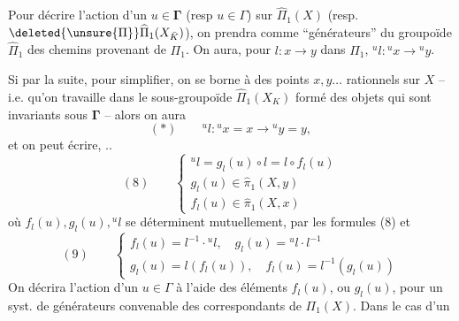 Pour décrire l'action d'un $u\in\mathbf{\Gamma}$ (resp $u\in\Gamma$) sur $\widehat\Pi_1(X)$ (resp. $\deleted{\unsure{\Pi}}\widehat\Pi_1(X_{\bar K})$), on prendra comme ``générateurs'' du groupoïde $\widehat\Pi_1$ des chemins provenant de $\Pi_1$. On aura, pour ${l}:x\to y$ dans $\Pi_1$, ${}^u{l}:{}^ux\to{}^uy$.

Si  par la suite, pour simplifier, on se borne à des points $x,y\ldots$ rationnels sur $X$ -- i.e. qu'on travaille dans le sous-groupoïde $\widehat\Pi_1(X_K)$ formé des objets qui sont invariants sous $\mathbf{\Gamma}$ -- alors on aura
\[
(*)\qquad{}^u{l}:{}^ux=x\longrightarrow{}^uy=y,
\]
et on peut écrire, ..
\[
(8)\qquad\begin{cases}
{}^u{l}=g_{l}(u)\circ{l}={l}\circ f_{l}(u)\\
g_{l}(u)\in\widehat\pi_1(X,y)\\
f_{l}(u)\in\widehat\pi_1(X,x)
\end{cases}
\]
où $f_{l}(u),g_{l}(u),{}^u{l}$ se déterminent mutuellement,  par les formules (8) et
\[
(9)\qquad\begin{cases}
f_{l}(u)={l}^{-1}\cdot{}^u{l},\quad g_{l}(u)={}^u{l}\cdot{l}^{-1}\\
g_{l}(u)={l}(f_{l}(u)),\quad f_{l}(u)={l}^{-1}(g_{l}(u))
\end{cases}
\]
On décrira l'action d'un $u\in\Gamma$  à l'aide des éléments $f_{l}(u)$, ou $g_{l}(u)$, pour un syst. de générateurs convenable des  correspondants de $\Pi_1(X)$. Dans le cas d'un

